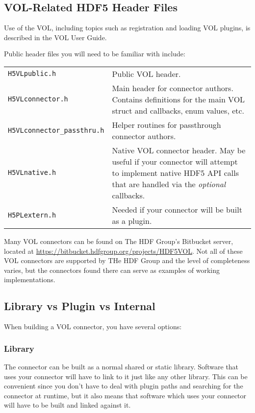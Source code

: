 \subsection{VOL-Related HDF5 Header Files}

Use of the VOL, including topics such as registration and loading VOL plugins, is
described in the VOL User Guide.

Public header files you will need to be familiar with include:

\begin{tabularx}{\linewidth}{ l X }
  \texttt{H5VLpublic.h} & Public VOL header.\\
  \texttt{H5VLconnector.h} & Main header for connector authors. Contains definitions for the main VOL struct and callbacks, enum values, etc.\\
  \texttt{H5VLconnector\_passthru.h} & Helper routines for passthrough connector authors.\\
    \texttt{H5VLnative.h} & Native VOL connector header. May be useful if your connector will attempt to implement native HDF5 API calls that are handled via the \textit{optional} callbacks.\\
  \texttt{H5PLextern.h} & Needed if your connector will be built as a plugin.\\
\end{tabularx}

Many VOL connectors can be found on The HDF Group's Bitbucket server, located at
\url{https://bitbucket.hdfgroup.org/projects/HDF5VOL}. Not all of these VOL
connectors are supported by THe HDF Group and the level of completeness varies,
but the connectors found there can serve as examples of working implementations.


\subsection{Library vs Plugin vs Internal}

When building a VOL connector, you have several options:

\subsubsection*{Library}

The connector can be built as a normal shared or static library. Software that
uses your connector will have to link to it just like any other library. This
can be convenient since you don't have to deal with plugin paths and searching
for the connector at runtime, but it also means that software which uses
your connector will have to be built and linked against it.

